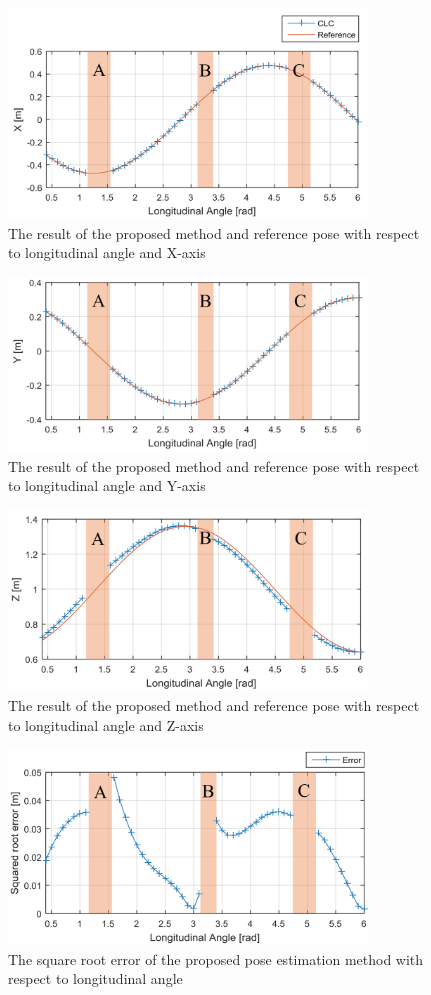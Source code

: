 \documentclass[master,korean,final]{cbnu-ecs}
\begin{document}
\begin{figure}[!ht]
  \centering
	\includegraphics[width=360px]{img/X_ang.png}
  \caption{The result of the proposed method and reference pose with respect to longitudinal angle and X-axis }
\label{X_ang}
\end{figure}
\begin{figure}[!ht]
  \centering
	\includegraphics[width=360px]{img/Y_ang.png}
  \caption{The result of the proposed method and reference pose with respect to longitudinal angle and Y-axis }
\label{Y_ang}
\end{figure}
\begin{figure}[!ht]
  \centering
	\includegraphics[width=360px]{img/Z_ang.png}
  \caption{The result of the proposed method and reference pose with respect to longitudinal angle and Z-axis }
\label{Z_ang}
\end{figure}
\begin{figure}[!ht]
  \centering
	\includegraphics[width=360px]{img/RMS_ang.png}
  \caption{The square root error of the proposed pose estimation method with respect to longitudinal angle}
\label{RMS_ang}
\end{figure}
\end{document}
